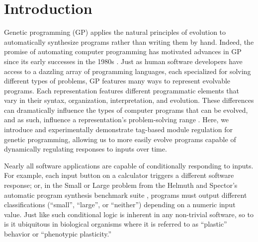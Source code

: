 \section{Introduction}

Genetic programming (GP) applies the natural principles of evolution to automatically synthesize programs rather than writing them by hand.
Indeed, the promise of automating computer programming has motivated advances in GP since its early successes in the 1980s \citep{forsyth_beagle_1981,cramer_representation_1985,koza_hierarchical_1989}. 
Just as human software developers have access to a dazzling array of programming languages, each specialized for solving different types of problems, GP features many ways to represent evolvable programs.
Each representation features different programmatic elements that vary in their syntax, organization, interpretation, and evolution.
These differences can dramatically influence the types of computer programs that can be evolved, and as such, influence a representation's problem-solving range \citep{hintze_buffet_2019,wilson_comparison_2008}. 
Here, we introduce and experimentally demonstrate tag-based module regulation for genetic programming, allowing us to more easily evolve programs capable of dynamically regulating responses to inputs over time.


Nearly all software applications are capable of conditionally responding to inputs.
For example, each input button on a calculator triggers a different software response; or, in the Small or Large problem from the Helmuth and Spector's automatic program synthesis benchmark suite \citep{helmuth_general_2015}, programs must output different classifications (``small'', ``large'', or ``neither'') depending on a numeric input value.
Just like such conditional logic is inherent in any non-trivial software, so to is it ubiquitous in biological organisms where it is referred to as ``plastic'' behavior or ``phenotypic plasticity.''

